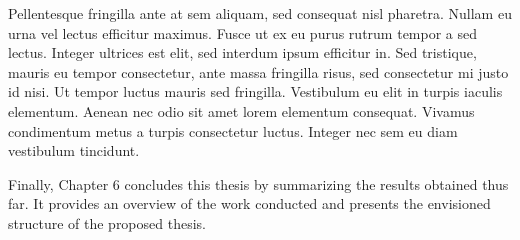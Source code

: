Pellentesque fringilla ante at sem aliquam, sed consequat nisl pharetra. Nullam eu urna vel lectus efficitur maximus. Fusce ut ex eu purus rutrum tempor a sed lectus. Integer ultrices est elit, sed interdum ipsum efficitur in. Sed tristique, mauris eu tempor consectetur, ante massa fringilla risus, sed consectetur mi justo id nisi. Ut tempor luctus mauris sed fringilla. Vestibulum eu elit in turpis iaculis elementum. Aenean nec odio sit amet lorem elementum consequat. Vivamus condimentum metus a turpis consectetur luctus. Integer nec sem eu diam vestibulum tincidunt.

Finally, Chapter 6 concludes this thesis by summarizing the results obtained thus far. It provides an overview of the work conducted and presents the envisioned structure of the proposed thesis.
